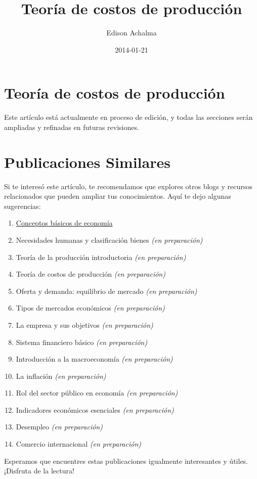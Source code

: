 \documentclass[
  jou,
  floatsintext,
  longtable,
  a4paper,
  nolmodern,
  notxfonts,
  notimes,
  12pt,
  colorlinks=true,linkcolor=blue,citecolor=blue,urlcolor=blue]{apa7}
\title{Teoría de costos de producción}
\author{Edison Achalma}
\affiliation{
{Escuela Profesional de Economía, Universidad Nacional de San Cristóbal
de Huamanga}}
\date{2014-01-21}
\providecommand{\tightlist}{%
  \setlength{\itemsep}{0pt}\setlength{\parskip}{0pt}}
\begin{document}
\maketitle


\hypertarget{toc}{}
\tableofcontents
\newpage
\section[Introduction]{Teoría de costos de producción}

\setcounter{secnumdepth}{3}

\setlength\LTleft{0pt}




Este artículo está actualmente en proceso de edición, y todas las
secciones serán ampliadas y refinadas en futuras revisiones.

\section{Publicaciones Similares}\label{publicaciones-similares}

Si te interesó este artículo, te recomendamos que explores otros blogs y
recursos relacionados que pueden ampliar tus conocimientos. Aquí te dejo
algunas sugerencias:

\begin{enumerate}
\def\labelenumi{\arabic{enumi}.}
\tightlist
\item
  \href{https://achalmaedison.netlify.app/cursos/pre_economia/2014-i/sesiones/01-conceptos-basicos-de-economia/index.pdf}{}
  \href{https://achalmaedison.netlify.app/cursos/pre_economia/2014-i/sesiones/01-conceptos-basicos-de-economia}{Conceptos
  básicos de economía}
\item
  Necesidades humanas y clasificación bienes \emph{(en preparación)}
\item
  Teoría de la producción introductoria \emph{(en preparación)}
\item
  Teoría de costos de producción \emph{(en preparación)}
\item
  Oferta y demanda: equilibrio de mercado \emph{(en preparación)}
\item
  Tipos de mercados económicos \emph{(en preparación)}
\item
  La empresa y sus objetivos \emph{(en preparación)}
\item
  Sistema financiero básico \emph{(en preparación)}
\item
  Introducción a la macroeconomía \emph{(en preparación)}
\item
  La inflación \emph{(en preparación)}
\item
  Rol del sector público en economía \emph{(en preparación)}
\item
  Indicadores económicos esenciales \emph{(en preparación)}
\item
  Desempleo \emph{(en preparación)}
\item
  Comercio internacional \emph{(en preparación)}
\end{enumerate}

Esperamos que encuentres estas publicaciones igualmente interesantes y
útiles. ¡Disfruta de la lectura!
\end{document}
